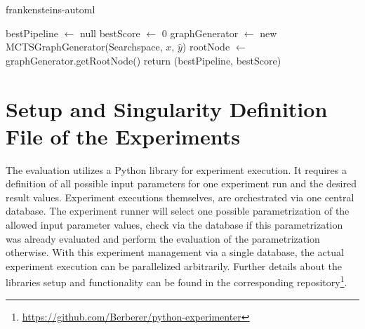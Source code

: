 \begin{algorithm}[H]
    \caption{frankensteins-automl}
    \SetAlgoLined
    \DontPrintSemicolon
    \BlankLine
    bestPipeline $\leftarrow$ null\;
    bestScore $\leftarrow$ 0\;
    graphGenerator $\leftarrow$ new MCTSGraphGenerator(Searchspace, $x$, $\hat{y}$)\;
    rootNode $\leftarrow$ graphGenerator.getRootNode()\;
    return (bestPipeline, bestScore)\;
\end{algorithm}

\section{Setup and Singularity Definition File of the Experiments}
\label{sec:appendix:singularity}
The evaluation utilizes a Python library for experiment execution.
It requires a definition of all possible input parameters for one experiment run and the desired result values.\newline
Experiment executions themselves, are orchestrated via one central database.
The experiment runner will select one possible parametrization of the allowed input parameter values, check via the database if this parametrization was already evaluated and perform the evaluation of the parametrization otherwise.
With this experiment management via a single database, the actual experiment execution can be parallelized arbitrarily.
Further details about the libraries setup and functionality can be found in the corresponding repository\footnote{\url{https://github.com/Berberer/python-experimenter}}.\newline

